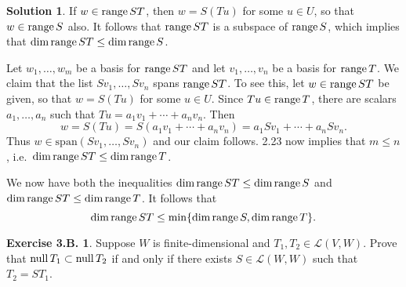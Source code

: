 \documentclass[12pt]{article}
\theoremstyle{definition}
\theoremstyle{exercise}
\newtheorem{exercise}{Exercise 3.B.}
\theoremstyle{solution}
\newtheorem*{solution}{Solution}
\newcommand{\lmap}{\mathcal{L}}
\newcommand{\Span}{\text{span}}
\newcommand{\Null}{\text{null\,}}
\newcommand{\Range}{\text{range\,}}
\begin{document}
\begin{solution}
    If \( w \in \Range ST \), then \( w = S(Tu) \) for some \( u \in U \), so that \( w \in \Range S \) also. It follows that \( \Range ST \) is a subspace of \( \Range S \), which implies that \( \dim \Range ST \leq \dim \Range S \).

    Let \( w_1, \ldots, w_m \) be a basis for \( \Range ST \) and let \( v_1, \ldots, v_n \) be a basis for \( \Range T \). We claim that the list \( Sv_1, \ldots, Sv_n \) spans \( \Range ST \). To see this, let \( w \in \Range ST \) be given, so that \( w = S(Tu) \) for some \( u \in U \). Since \( Tu \in \Range T \), there are scalars \( a_1, \ldots, a_n \) such that \( Tu = a_1 v_1 + \cdots + a_n v_n \). Then
    \[
        w = S(Tu) = S(a_1 v_1 + \cdots + a_n v_n) = a_1 Sv_1 + \cdots + a_n Sv_n.
    \]
    Thus \( w \in \Span(Sv_1, \ldots, Sv_n) \) and our claim follows. 2.23 now implies that \( m \leq n \), i.e.\ \( \dim \Range ST \leq \dim \Range T \).

    We now have both the inequalities \( \dim \Range ST \leq \dim \Range S \) and \( \dim \Range ST \leq \dim \Range T \). It follows that
    \[
        \dim \Range ST \leq \min \{ \dim \Range S, \dim \Range T \}.
    \]
\end{solution}

\begin{exercise}
\label{ex:24}
    Suppose \( W \) is finite-dimensional and \( T_1, T_2 \in \lmap(V, W) \). Prove that \( \Null T_1 \subset \Null T_2 \) if and only if there exists \( S \in \lmap(W, W) \) such that \( T_2 = ST_1 \).
\end{exercise}
\end{document}
